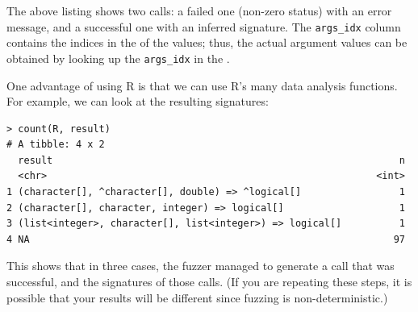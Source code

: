 \documentclass[sigplan,nonacm,anonymous,review]{acmart}
\begin{document}
The above listing shows two calls: a failed one (non-zero status) with an error message, and a successful one with an inferred signature.
The \texttt{args\_idx} column contains the indices in the \sxpdb of the values; thus, the actual argument values can be obtained by looking up the {\tt args\_idx} in the \sxpdb.

One advantage of using R is that we can use R's many data analysis functions.
For example, we can look at the resulting signatures:

\begin{lstlisting}
> count(R, result)
# A tibble: 4 x 2
  result                                                            n
  <chr>                                                         <int>
1 (character[], ^character[], double) => ^logical[]                 1
2 (character[], character, integer) => logical[]                    1
3 (list<integer>, character[], list<integer>) => logical[]          1
4 NA                                                               97
\end{lstlisting}

This shows that in three cases, the fuzzer managed to generate a call that was successful, and the signatures of those calls.
(If you are repeating these steps, it is possible that your results will be different since fuzzing is non-deterministic.)
\end{document}
